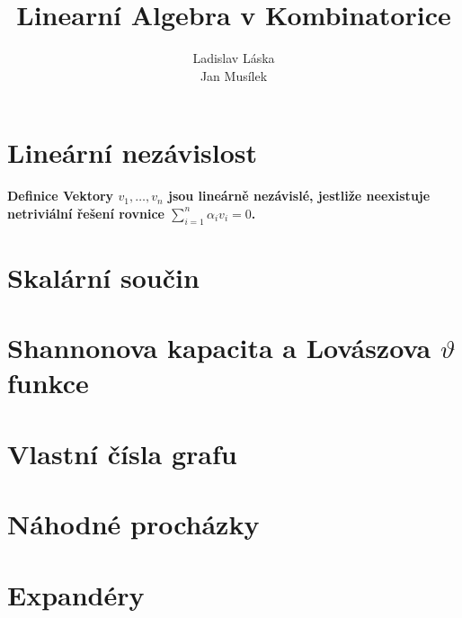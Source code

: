 \documentclass[a4paper,12pt,titlepage]{article}
\title{Linearní Algebra v Kombinatorice}
\author{Ladislav Láska\\ Jan Musílek}
\newcommand{\df}{\smallskip\noindent\bf Definice\rm{} }
\begin{document}
\maketitle
\newpage
\tableofcontents
\newpage


\section{Lineární nezávislost}

\df Vektory $v_1,\dots,v_n$ jsou lineárně nezávislé, jestliže neexistuje netriviální řešení 
rovnice $\sum_{i=1}^n \alpha_iv_i=0$.







\section{Skalární součin}





\section{Shannonova kapacita a Lovászova $\vartheta$ funkce}





\section{Vlastní čísla grafu}







\section{Náhodné procházky}





\section{Expandéry}




\end{document}
